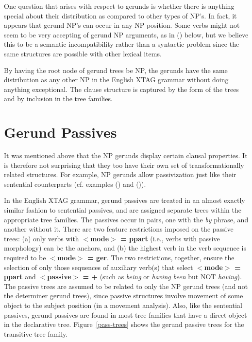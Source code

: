 
One question that arises with respect to gerunds is whether there is anything
special about their distribution as compared to other types of NP's.  In fact,
it appears that gerund NP's can occur in any NP position.  Some verbs might not
seem to be very accepting of gerund NP arguments, as in () below, but we
believe this to be a semantic incompatibility rather than a syntactic problem
since the same structures are possible with other lexical items.


By having the root node of gerund trees be NP, the gerunds have the same
distribution as any other NP in the English XTAG grammar without doing
anything exceptional. The clause structure is captured by the form of the trees
and by inclusion in the tree families.

\section{Gerund Passives}

It was mentioned above that the NP gerunds display certain clausal
properties. It is therefore not surprising that they too have their own set
of transformationally related structures. For example, NP gerunds allow
passivization just like their sentential counterparts (cf. examples
() and ()).


In the English XTAG grammar, gerund passives are treated in an almost
exactly similar fashion to sentential passives, and are assigned separate
trees within the appropriate tree families. The passives occur in pairs,
one with the {\it by} phrase, and another without it. There are two feature
restrictions imposed on the passive trees: (a) only verbs with {\bf
$<$mode$>$ = ppart} (i.e., verbs with passive morphology) can be the
anchors, and (b) the highest verb in the verb sequence is required to be
{\bf $<$mode$>$ = ger}. The two restrictions, together, ensure the
selection of only those sequences of auxiliary verb(s) that select {\bf
$<$mode$>$ = ppart} and {\bf $<$passive$>$ = +} (such as {\it being} or
{\it having been} but NOT {\it having}). The passive trees are assumed to
be related to only the NP gerund trees (and not the determiner gerund
trees), since passive structures involve movement of some object to the
subject position (in a movement analysis). Also, like the sentential
passives, gerund passives are found in most tree families that have a
direct object in the declarative tree. Figure~\ref{pass-trees} shows
the gerund passive trees for the transitive tree family.


